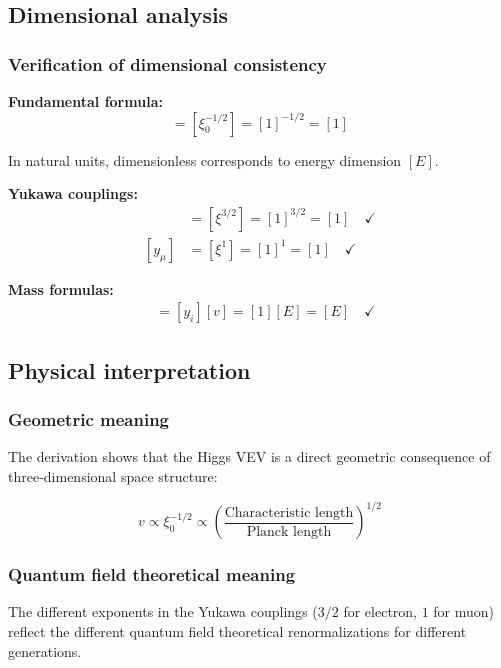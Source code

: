 \documentclass[12pt,a4paper]{report}
\begin{document}
\subsection{Dimensional analysis}

\subsubsection{Verification of dimensional consistency}

\textbf{Fundamental formula:}
\begin{equation}
	[v] = [\xi_0^{-1/2}] = [1]^{-1/2} = [1]
\end{equation}

In natural units, dimensionless corresponds to energy dimension $[E]$.

\textbf{Yukawa couplings:}
\begin{align}
	[y_e] &= [\xi^{3/2}] = [1]^{3/2} = [1] \quad \checkmark\\
	[y_\mu] &= [\xi^1] = [1]^1 = [1] \quad \checkmark
\end{align}

\textbf{Mass formulas:}
\begin{align}
	[m_i] &= [y_i][v] = [1][E] = [E] \quad \checkmark
\end{align}

\subsection{Physical interpretation}

\subsubsection{Geometric meaning}

The derivation shows that the Higgs VEV is a direct geometric consequence of three-dimensional space structure:

\begin{equation}
	v \propto \xi_0^{-1/2} \propto \left(\frac{\text{Characteristic length}}{\text{Planck length}}\right)^{1/2}
\end{equation}

\subsubsection{Quantum field theoretical meaning}

The different exponents in the Yukawa couplings ($3/2$ for electron, $1$ for muon) reflect the different quantum field theoretical renormalizations for different generations.
\end{document}
